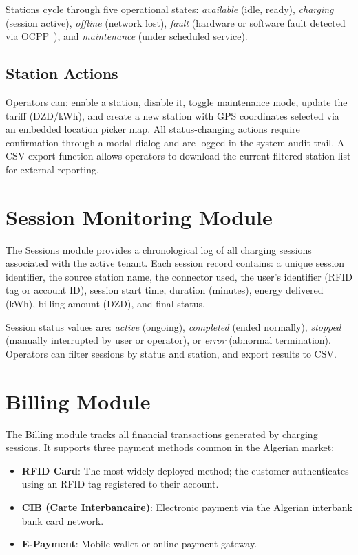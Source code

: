 \documentclass[12pt,a4paper]{report}
\begin{document}
Stations cycle through five operational states: \textit{available} (idle, ready),
\textit{charging} (session active), \textit{offline} (network lost), \textit{fault} (hardware
or software fault detected via OCPP~\autocite{ocpp16_ed2}), and \textit{maintenance} (under
scheduled service).

\subsection{Station Actions}

Operators can: enable a station, disable it, toggle maintenance mode, update the tariff
(DZD/kWh), and create a new station with GPS coordinates selected via an embedded location
picker map. All status-changing actions require confirmation through a modal dialog and are
logged in the system audit trail. A CSV export function allows operators to download the
current filtered station list for external reporting.

\section{Session Monitoring Module}

The Sessions module provides a chronological log of all charging sessions associated with the
active tenant. Each session record contains: a unique session identifier, the source station
name, the connector used, the user's identifier (RFID tag or account ID), session start time,
duration (minutes), energy delivered (kWh), billing amount (DZD), and final status.

Session status values are: \textit{active} (ongoing), \textit{completed} (ended normally),
\textit{stopped} (manually interrupted by user or operator), or \textit{error} (abnormal
termination). Operators can filter sessions by status and station, and export results to CSV.

\section{Billing Module}

The Billing module tracks all financial transactions generated by charging sessions. It supports
three payment methods common in the Algerian market:

\begin{itemize}
  \item \textbf{RFID Card}: The most widely deployed method; the customer authenticates using
        an RFID tag registered to their account.
  \item \textbf{CIB (Carte Interbancaire)}: Electronic payment via the Algerian interbank bank
        card network.
  \item \textbf{E-Payment}: Mobile wallet or online payment gateway.
\end{itemize}
\end{document}
